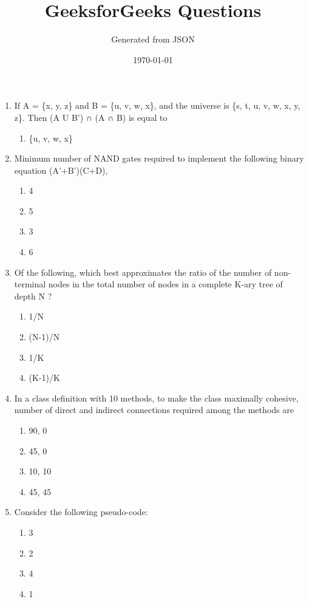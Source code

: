 \documentclass[12pt]{article}
\title{GeeksforGeeks Questions}
\author{Generated from JSON}
\date{\today}
\begin{document}
\maketitle

\begin{enumerate}

\item[1.] If A = \{x, y, z\} and B = \{u, v, w, x\}, and the universe is \{s, t, u, v, w, x, y, z\}. Then (A U B') ∩ (A ∩ B) is equal to
\begin{enumerate}[label=\Alph*.]
  \item \{u, v, w, x\}
\end{enumerate}

\item[2.] Minimum number of NAND gates required to implement the following binary equation (A'+B')(C+D),
\begin{enumerate}[label=\Alph*.]
  \item 4
  \item 5
  \item 3
  \item 6
\end{enumerate}

\item[3.] Of the following, which best approximates the ratio of the number of non-terminal nodes in the total number of nodes in a complete K-ary tree of depth N ?
\begin{enumerate}[label=\Alph*.]
  \item 1/N
  \item (N-1)/N
  \item 1/K
  \item (K-1)/K
\end{enumerate}

\item[4.] In a class definition with 10 methods, to make the class maximally cohesive, number of direct and indirect connections required among the methods are
\begin{enumerate}[label=\Alph*.]
  \item 90, 0
  \item 45, 0
  \item 10, 10
  \item 45, 45
\end{enumerate}

\item[5.] Consider the following pseudo-code:
\begin{enumerate}[label=\Alph*.]
  \item 3
  \item 2
  \item 4
  \item 1
\end{enumerate}


\end{enumerate}
\end{document}
